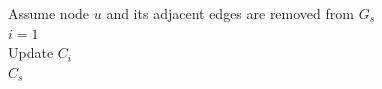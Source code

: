 \begin{function8}
\caption{\small$CommunityAfterNodeRemoval(u,C_s)$}
Assume node $u$ and its adjacent edges are removed from $G_s$\\
$i=1$\\
Update $C_i$\\%
\Return $C_s$   
\end{function8}


